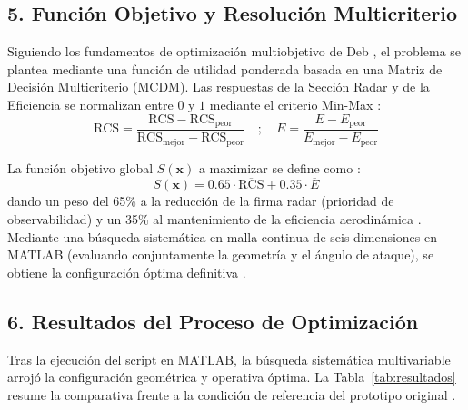 \documentclass[11pt, a4paper]{article}
\begin{document}
\subsection*{5. Función Objetivo y Resolución Multicriterio}
Siguiendo los fundamentos de optimización multiobjetivo de Deb \cite{deb}, el problema se plantea mediante una función de utilidad ponderada basada en una Matriz de Decisión Multicriterio (MCDM). Las respuestas de la Sección Radar y de la Eficiencia se normalizan entre $0$ y $1$ mediante el criterio Min-Max \cite{deb}:
\begin{equation}
    \overline{\text{RCS}} = \frac{\text{RCS} - \text{RCS}_{\text{peor}}}{\text{RCS}_{\text{mejor}} - \text{RCS}_{\text{peor}}} \quad ; \quad \overline{E} = \frac{E - E_{\text{peor}}}{E_{\text{mejor}} - E_{\text{peor}}}
\end{equation}

La función objetivo global $S(\mathbf{x})$ a maximizar se define como \cite{deb}:
\begin{equation}
    S(\mathbf{x}) = 0.65 \cdot \overline{\text{RCS}} + 0.35 \cdot \overline{E}
\end{equation}
dando un peso del 65\% a la reducción de la firma radar (prioridad de observabilidad) y un 35\% al mantenimiento de la eficiencia aerodinámica \cite{deb}. Mediante una búsqueda sistemática en malla continua de seis dimensiones en MATLAB (evaluando conjuntamente la geometría y el ángulo de ataque), se obtiene la configuración óptima definitiva \cite{anderson, deb}.

\subsection*{6. Resultados del Proceso de Optimización}
Tras la ejecución del script en MATLAB, la búsqueda sistemática multivariable arrojó la configuración geométrica y operativa óptima. La Tabla~\ref{tab:resultados} resume la comparativa frente a la condición de referencia del prototipo original \cite{anderson}.
\end{document}
